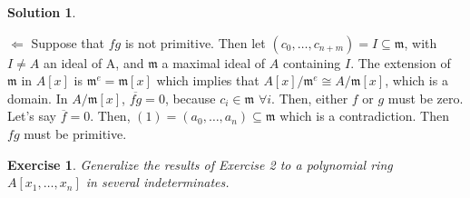 \documentclass[12pt]{article}
\newcommand*\closure[1]{\overline{#1}}
\newtheorem{ex}{Exercise}[section]
\theoremstyle{definition}
\newtheorem*{sol}{Solution}
\begin{document}
\begin{sol}
\begin{enumerate}[label=(\roman*)]
	$\boxed{\Leftarrow}$ Suppose that $fg$ is not primitive. Then let $(c_0, \dots, c_{n+m}) = I \subseteq \mathfrak{m}$, with $I \neq A$ an ideal of A, and $\mathfrak{m}$ a maximal ideal of $A$ containing $I$. The extension of $\mathfrak{m}$ in $A[x]$ is $\mathfrak{m}^e = \mathfrak{m}[x]$ which implies that $A[x]/\mathfrak{m}^e \cong A/\mathfrak{m} [x]$, which is a domain. In $A/\mathfrak{m} [x]$, $\closure{fg} = 0$, because $c_i \in \mathfrak{m} \, \, \forall i$. Then, either $f$ or $g$ must be zero. Let's say $\closure{f} = 0$. Then, $(1) = (a_0, \dots, a_n) \subseteq \mathfrak{m}$ which is a contradiction. Then $fg$ must be primitive.

\end{enumerate}
\end{sol}

\begin{ex}
	Generalize the results of Exercise 2 to a polynomial ring $A[x_1, \dots, x_n]$ in several indeterminates.
\end{ex}
\end{document}
